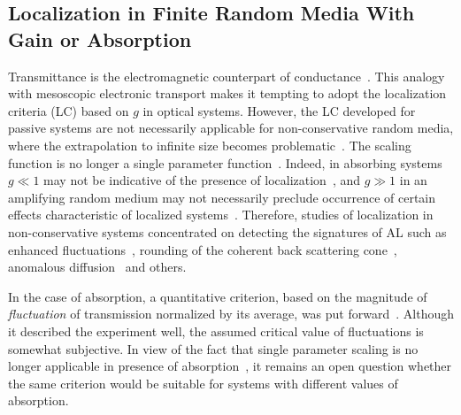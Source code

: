 \subsection{Localization in Finite Random Media With Gain or Absorption}

Transmittance is the electromagnetic counterpart of conductance~\cite{1988_Stone}. This analogy with mesoscopic electronic transport makes it tempting to adopt the localization criteria (LC) based on $g$ in optical systems. However, the LC developed for passive systems are not necessarily applicable for non-conservative random media, where the extrapolation to infinite size becomes problematic~\cite{1999_van_Tiggelen}. The scaling function is no longer a single parameter function~\cite{1994_Freilikher_absorption}. Indeed, in absorbing systems $g\ll 1$ may not be indicative of the presence of localization~\cite{1998_Brouwer,2000_chabanov_nature}, and $g\gg 1$ in an amplifying random medium may not necessarily preclude occurrence of certain effects characteristic of localized systems~\cite{2004_Yamilov_intensity,2006_Yamilov_conductance}. Therefore, studies of localization in non-conservative systems concentrated on detecting the signatures of AL such as enhanced fluctuations~\cite{1994_Kumar,1995_Zhang,1996_Paasschens_gain,1997_Freilikher_gain,1998_Maret_PRL,2000_chabanov_nature,2006_Yamilov_conductance}, rounding of the coherent back scattering cone~\cite{1997_Wiersma_cbs,1999_Kaiser_cbs,2009_Maret}, anomalous diffusion~\cite{1989_Genack,1997_wiersma_nature,2006_Maret,2007_Segev,2008_van_Tiggelen_Nature,2009_Genack_PRB} and others.

In the case of absorption, a quantitative criterion, based on the magnitude of {\it fluctuation} of transmission normalized by its average, was put forward~\cite{2000_chabanov_nature}. Although it described the experiment well, the assumed critical value of fluctuations is somewhat subjective. In view of the fact that single parameter scaling is no longer applicable in presence of absorption~\cite{1994_Freilikher_absorption}, it remains an open question whether the same criterion would be suitable for systems with different values of absorption. 

